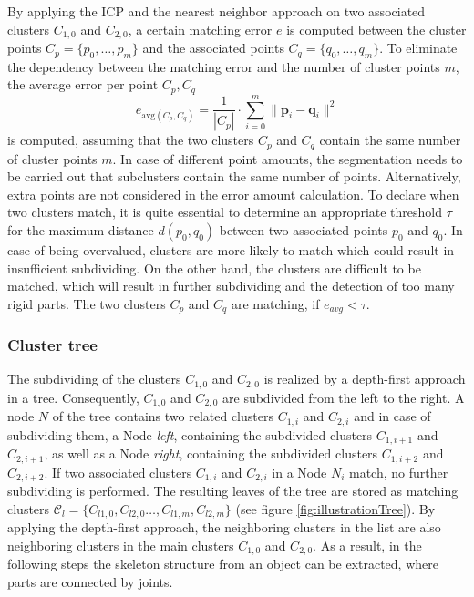 By applying the ICP and the nearest neighbor approach on two associated clusters $C_{1,0}$ and $C_{2,0}$, a certain matching error $e$ is computed between the cluster points $ C_p =  \{ p_0, \ldots, p_m\}$ and the associated points $ C_q =  \{ q_0, \ldots, q_m\}$. To eliminate the dependency between the matching error and the number of cluster points $m$, the average error per point $C_p, C_q$
%
\begin{equation}
	e_{\mathrm{avg}(C_p, C_q)} = \frac{1}{| C_p |} \cdot \displaystyle\sum_{i=0}^{m}\| \boldsymbol{p}_i - \boldsymbol{q}_i\|^2
\end{equation}
%
is computed, assuming that the two clusters $C_p$ and $C_q$ contain the same number of cluster points $m$. In case of different point amounts, the segmentation needs to be carried out that subclusters contain the same number of points. Alternatively, extra points are not considered in the error amount calculation. To declare when two clusters match, it is quite essential to determine an appropriate threshold $\tau$ for the maximum distance $d(p_0, q_0)$ between two associated points $p_0$ and $q_0$. In case of being overvalued, clusters are more likely to match which could result in insufficient subdividing. On the other hand, the clusters are difficult to be matched, which will result in further subdividing and the detection of too many rigid parts. The two clusters $C_p$ and $C_q$ are matching, if $e_{avg} < \tau$.

\subsubsection{Cluster tree}
\label{tree}

The subdividing of the clusters $C_{1,0}$ and $C_{2,0}$ is realized by a depth-first approach in a tree. Consequently, $C_{1,0}$ and $C_{2,0}$ are subdivided from the left to the right. A node $N$ of the tree contains two related clusters $C_{1,i}$ and $C_{2,i}$ and in case of subdividing them, a Node \textit{left}, containing the subdivided clusters $C_{1,i+1}$ and $C_{2,i+1}$, as well as a Node \textit{right}, containing the subdivided clusters $C_{1,i+2}$ and $C_{2,i+2}$. If two associated clusters $C_{1,i}$ and $C_{2,i}$ in a Node $N_i$ match, no further subdividing is performed. The resulting leaves of the tree are stored as matching clusters $\mathcal{C}_l = \{C_{l1,0},C_{l2,0}\ldots,C_{l1,m},C_{l2,m}\}$ (see figure \ref{fig:illustrationTree}). By applying the depth-first approach, the neighboring clusters in the list are also neighboring clusters in the main clusters $C_{1,0}$ and $C_{2,0}$.  As a result, in the following steps the skeleton structure from an object can be extracted, where parts are connected by joints.

